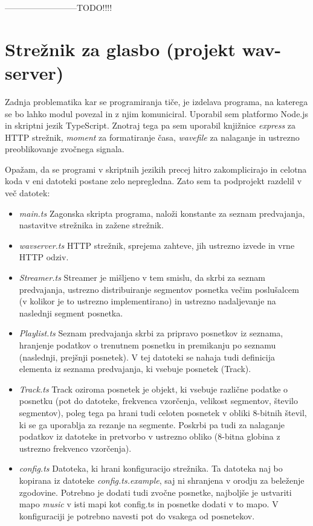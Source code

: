 \documentclass[12pt,a4paper,twoside,openright,slovene]{book}
\begin{document}
--------------------------TODO!!!!




\section{Strežnik za glasbo (projekt wav-server)}

Zadnja problematika kar se programiranja tiče, je izdelava programa, na katerega se bo lahko modul povezal in z njim komuniciral. Uporabil sem platformo Node.js in skriptni jezik TypeScript. Znotraj tega pa sem uporabil knjižnice \textit{express} za HTTP strežnik, \textit{moment} za formatiranje časa, \textit{wavefile} za nalaganje in ustrezno preoblikovanje zvočnega signala. 

Opažam, da se programi v skriptnih jezikih precej hitro zakomplicirajo in celotna koda v eni datoteki postane zelo nepregledna. Zato sem ta podprojekt razdelil v več datotek:

\begin{itemize}
	\item \textit{main.ts}
	Zagonska skripta programa, naloži konstante za seznam predvajanja, nastavitve strežnika in zažene strežnik.
	\item \textit{wavserver.ts}
	HTTP strežnik, sprejema zahteve, jih ustrezno izvede in vrne HTTP odziv.
	\item \textit{Streamer.ts}
	Streamer je mišljeno v tem smislu, da skrbi za seznam predvajanja, ustrezno distribuiranje segmentov posnetka večim poslušalcem (v kolikor je to ustrezno implementirano) in ustrezno nadaljevanje na naslednji segment posnetka.
	\item \textit{Playlist.ts}
	Seznam predvajanja skrbi za pripravo posnetkov iz seznama, hranjenje podatkov o trenutnem posnetku in premikanju po seznamu (naslednji, prejšnji posnetek). V tej datoteki se nahaja tudi definicija elementa iz seznama predvajanja, ki vsebuje posnetek (Track).
	\item \textit{Track.ts}
	Track oziroma posnetek je objekt, ki vsebuje različne podatke o posnetku (pot do datoteke, frekvenca vzorčenja, velikost segmentov, število segmentov), poleg tega pa hrani tudi celoten posnetek v obliki 8-bitnih števil, ki se ga uporablja za rezanje na segmente. Poskrbi pa tudi za nalaganje podatkov iz datoteke in pretvorbo v ustrezno obliko (8-bitna globina z ustrezno frekvenco vzorčenja).
	\item \textit{config.ts}
	Datoteka, ki hrani konfiguracijo strežnika. Ta datoteka naj bo kopirana iz datoteke \textit{config.ts.example}, saj ni shranjena v orodju za beleženje zgodovine. Potrebno je dodati tudi zvočne posnetke, najboljše je ustvariti mapo \textit{music} v isti mapi kot config.ts in posnetke dodati v to mapo. V konfiguraciji je potrebno navesti pot do vsakega od posnetekov.
\end{itemize}
\end{document}
